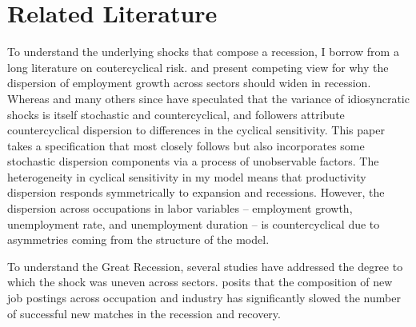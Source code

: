 \documentclass[12pt]{article}
\theoremstyle{definition}
\begin{document}
\section{Related Literature}

To understand the underlying shocks that compose a recession, I borrow from a long literature on coutercyclical risk. \citet{lilienSectoralShiftsCyclical1982} and \citet{abrahamCyclicalUnemploymentSectoral1986} present competing view for why the dispersion of employment growth across sectors should widen in recession. Whereas \citet{lilienSectoralShiftsCyclical1982} and many others since have speculated that the variance of idiosyncratic shocks is itself stochastic and countercyclical, \citet{abrahamCyclicalUnemploymentSectoral1986} and followers attribute countercyclical dispersion to differences in the cyclical sensitivity. This paper takes a specification that most closely follows \citet{abrahamCyclicalUnemploymentSectoral1986} but also incorporates some stochastic dispersion components via a process of unobservable factors. The heterogeneity in cyclical sensitivity in my model means that productivity dispersion responds symmetrically to expansion and recessions. However, the dispersion across occupations in labor variables -- employment growth, unemployment rate, and unemployment duration -- is countercyclical due to asymmetries coming from the structure of the model.

To understand the Great Recession, several studies have addressed the degree to which the shock was uneven across sectors. \citet{hobijnIndustryOccupationMixUS2012} posits that the composition of new job postings across occupation and industry has significantly slowed the number of successful new matches in the recession and recovery. 
\end{document}
